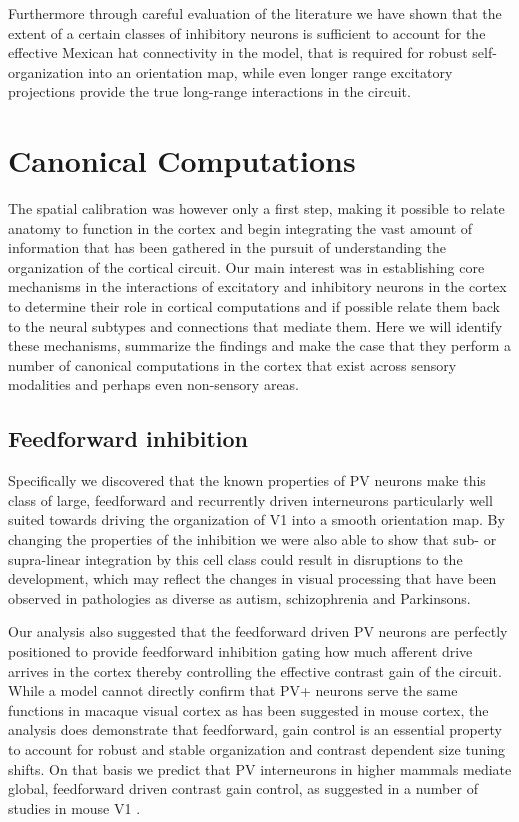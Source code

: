Furthermore through careful evaluation of the literature we have shown
that the extent of a certain classes of inhibitory neurons is
sufficient to account for the effective Mexican hat connectivity in
the model, that is required for robust self-organization into an
orientation map, while even longer range excitatory projections
provide the true long-range interactions in the circuit.

\section{Canonical Computations}

The spatial calibration was however only a first step, making it
possible to relate anatomy to function in the cortex and begin
integrating the vast amount of information that has been gathered in
the pursuit of understanding the organization of the cortical
circuit. Our main interest was in establishing core mechanisms in the
interactions of excitatory and inhibitory neurons in the cortex to
determine their role in cortical computations and if possible relate
them back to the neural subtypes and connections that mediate
them. Here we will identify these mechanisms, summarize the findings
and make the case that they perform a number of canonical computations
in the cortex that exist across sensory modalities and perhaps even
non-sensory areas.

\subsection{Feedforward inhibition}

Specifically we discovered that the known properties of PV neurons
make this class of large, feedforward and recurrently driven
interneurons particularly well suited towards driving the organization
of V1 into a smooth orientation map. By changing the properties of the
inhibition we were also able to show that sub- or supra-linear
integration by this cell class could result in disruptions to the
development, which may reflect the changes in visual processing that
have been observed in pathologies as diverse as autism, schizophrenia
and Parkinsons.

Our analysis also suggested that the feedforward driven PV neurons are
perfectly positioned to provide feedforward inhibition gating how much
afferent drive arrives in the cortex thereby controlling the effective
contrast gain of the circuit. While a model cannot directly confirm
that PV+ neurons serve the same functions in macaque visual cortex as
has been suggested in mouse cortex, the analysis does demonstrate that
feedforward, gain control is an essential property to account for
robust and stable organization and contrast dependent size tuning
shifts. On that basis we predict that PV interneurons in higher
mammals mediate global, feedforward driven contrast gain control, as
suggested in a number of studies in mouse V1 \citep{Ma2010,
  Atallah2012, Wilson2012, Nienborg2013}.


